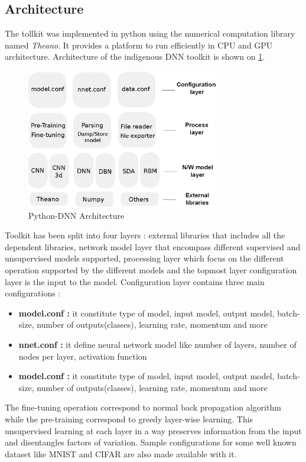 \subsection{Architecture}
The tollkit was implemented in python using the numerical computation library named  \textit{Theano}. It provides a platform to run efficiently in CPU and GPU architecture.
Architecture of the indigenous DNN toolkit is shown on \ref{fig:architecture}.
\begin{figure}[htpb]
   \begin{center}
	    \includegraphics[width=0.75\textwidth]{snaps/architecture.eps}     
     \caption {Python-DNN Architecture}
	 \label{fig:architecture}
   \end{center}
 \end{figure}
 Toolkit has been split into four layers : external libraries that includes all the dependent libraries, network model layer that encompass different supervised and unsupervised models supported,  processing layer which focus on the different operation supported by the different models and  the topmost layer configuration layer is the input to the model. Configuration layer contains three main configurations : 
 \begin{itemize}
	\item {\textbf{model.conf :} it constitute type of model, input model, output model, batch-size, number of outputs(classes), learning rate, momentum and more}
	\item {\textbf{nnet.conf :} it define neural network model like number of layers, number of nodes per layer, activation function}
	\item {\textbf{model.conf :} it constitute type of model, input model, output model, batch-size, number of outputs(classes), learning rate, momentum and more}
 \end{itemize}
The fine-tuning operation  correspond to normal back propagation algorithm while the pre-training correspond to greedy layer-wise learning. This unsupervised learning at each layer in a way preserves information from the input and disentangles factors of variation. Sample configurations for some well known dataset like MNIST and CIFAR are also made available with it.
